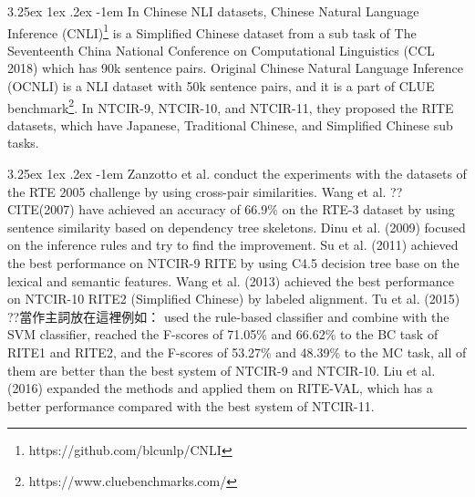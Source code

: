 \documentclass[12pt]{article}
\makeatletter
\renewcommand\paragraph{\@startsection{paragraph}{5}{\z@}%
  {3.25ex \@plus1ex \@minus.2ex}%
  {-1em}%
  {\normalfont\normalsize\bfseries}}
\makeatother
\begin{document}
\begin{CJK*}{UTF8}{bkai}
\begin{spacing}{1.77}
\paragraph{}
In Chinese NLI datasets, Chinese Natural Language Inference (CNLI)\footnote{https://github.com/blcunlp/CNLI} is a Simplified Chinese dataset from a sub task of The Seventeenth China National Conference on Computational Linguistics (CCL 2018) which has 90k sentence pairs. Original Chinese Natural Language Inference (OCNLI) is a NLI dataset with 50k sentence pairs, and it is a part of CLUE benchmark\footnote{https://www.cluebenchmarks.com/}. In NTCIR-9\cite{ntcir9rite1}, NTCIR-10\cite{ntcir10rite2}, and NTCIR-11\cite{ntcir11rite-val}, they proposed the RITE datasets, which have Japanese, Traditional Chinese, and Simplified Chinese sub tasks.

\paragraph{}
Zanzotto et al. \cite{zanzotto_moschitti_2006} conduct the experiments with the datasets of the RTE 2005 challenge by using cross-pair similarities. Wang et al. ??CITE(2007) have achieved an accuracy of 66.9\% on the RTE-3 dataset by using sentence similarity based on dependency tree skeletons. Dinu et al. (2009)\cite{dinu_wang_2009} focused on the inference rules and try to find the improvement. Su et al. (2011)\cite{su_zheng_2011} achieved the best performance on NTCIR-9 RITE by using C4.5 decision tree base on the lexical and semantic features. Wang et al. (2013)\cite{wang-etal-2013-labeled} achieved the best performance on NTCIR-10 RITE2 (Simplified Chinese) by labeled alignment. Tu et al. (2015)\cite{tu_2015} ??當作主詞放在這裡例如： used the rule-based classifier and combine with the SVM classifier, reached the F-scores of 71.05\% and 66.62\% to the BC task of RITE1 and RITE2, and the F-scores of 53.27\% and 48.39\% to the MC task, all of them are better than the best system of NTCIR-9 and NTCIR-10. Liu et al. (2016)\cite{liu_2016} expanded the methods and applied them on RITE-VAL, which has a better performance compared with the best system of NTCIR-11.


\end{spacing}
\end{CJK*}
\end{document}
